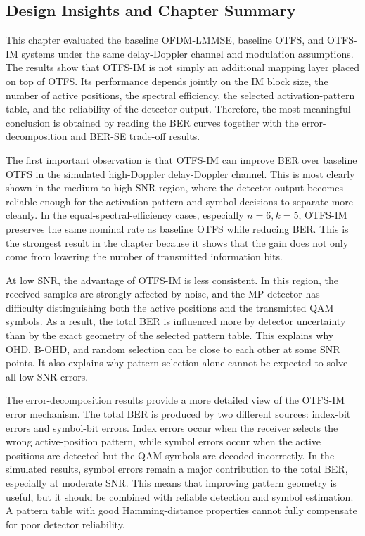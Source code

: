 
\subsection{Design Insights and Chapter Summary}

This chapter evaluated the baseline OFDM-LMMSE, baseline OTFS, and OTFS-IM systems under the same delay-Doppler channel and modulation assumptions. The results show that OTFS-IM is not simply an additional mapping layer placed on top of OTFS. Its performance depends jointly on the IM block size, the number of active positions, the spectral efficiency, the selected activation-pattern table, and the reliability of the detector output. Therefore, the most meaningful conclusion is obtained by reading the BER curves together with the error-decomposition and BER-SE trade-off results.

The first important observation is that OTFS-IM can improve BER over baseline OTFS in the simulated high-Doppler delay-Doppler channel. This is most clearly shown in the medium-to-high-SNR region, where the detector output becomes reliable enough for the activation pattern and symbol decisions to separate more cleanly. In the equal-spectral-efficiency cases, especially \(n=6,k=5\), OTFS-IM preserves the same nominal rate as baseline OTFS while reducing BER. This is the strongest result in the chapter because it shows that the gain does not only come from lowering the number of transmitted information bits.

At low SNR, the advantage of OTFS-IM is less consistent. In this region, the received samples are strongly affected by noise, and the MP detector has difficulty distinguishing both the active positions and the transmitted QAM symbols. As a result, the total BER is influenced more by detector uncertainty than by the exact geometry of the selected pattern table. This explains why OHD, B-OHD, and random selection can be close to each other at some SNR points. It also explains why pattern selection alone cannot be expected to solve all low-SNR errors.

The error-decomposition results provide a more detailed view of the OTFS-IM error mechanism. The total BER is produced by two different sources: index-bit errors and symbol-bit errors. Index errors occur when the receiver selects the wrong active-position pattern, while symbol errors occur when the active positions are detected but the QAM symbols are decoded incorrectly. In the simulated results, symbol errors remain a major contribution to the total BER, especially at moderate SNR. This means that improving pattern geometry is useful, but it should be combined with reliable detection and symbol estimation. A pattern table with good Hamming-distance properties cannot fully compensate for poor detector reliability.

